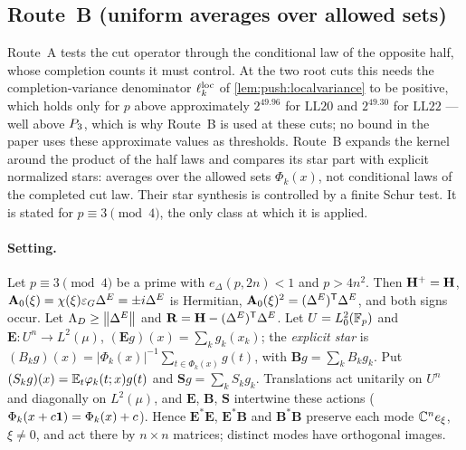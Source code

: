 \subsection{Route~B (uniform averages over allowed sets)}\label{subsec:spec:routeB}

Route~A tests the cut operator through the conditional law of the opposite half,
whose completion counts it must control. At the two root cuts this needs the
completion-variance denominator $\ell^{\rm loc}_k$ of \cref{lem:push:localvariance} to
be positive, which holds only for $p$ above approximately
$2^{49.96}$ for $\mathrm{LL20}$ and $2^{49.30}$ for
$\mathrm{LL22}$ --- well above $P_3$, which is why Route~B
is used at these cuts; no bound in the paper uses these
approximate values as thresholds. Route~B expands the kernel
around the product of the
half laws and compares its star part with explicit normalized stars: averages over
the allowed sets $\Phi_k(x)$, not conditional laws of the completed cut law. Their
star synthesis is controlled by a finite Schur test. It is stated for $p\equiv3\pmod4$, the
only class at which it is applied.

\paragraph{Setting.}
Let $p\equiv3\pmod4$ be a prime with $e_\Delta(p,2n)<1$ and $p>4n^2$. Then
$\mathbf H^+=\mathbf H$, $\mathbf A_{0}(\xi)=\chi(\xi)\varepsilon_G\Delta^E=\pm i\Delta^E$ is Hermitian,
$\mathbf A_{0}(\xi)^2=(\Delta^E)^{\mathsf T}\Delta^E$, and both signs occur. Let $\Lambda_D\ge\left\|\Delta^E\right\|$
and $\mathbf R=\mathbf H-(\Delta^E)^{\mathsf T}\Delta^E$. Let $U=L^2_0(\mathbb F_p)$ and
$\mathbf E\colon U^n\to L^2(\mu)$, $(\mathbf Eg)(x)=\sum_kg_k(x_k)$; the \emph{explicit star}
is $(B_kg)(x)=|\Phi_k(x)|^{-1}\sum_{t\in\Phi_k(x)}g(t)$, with $\mathbf Bg=\sum_kB_kg_k$. Put
$(S_kg)(x)=\mathbb E_t\varphi_k(t;x)g(t)$ and $\mathbf Sg=\sum_kS_kg_k$. Translations act unitarily
on $U^n$ and diagonally on $L^2(\mu)$, and $\mathbf E$, $\mathbf B$, $\mathbf S$ intertwine
these actions ($\Phi_k(x+c\mathbf 1)=\Phi_k(x)+c$). Hence $\mathbf E^*\mathbf E$, $\mathbf E^*\mathbf B$
and $\mathbf B^*\mathbf B$ preserve each mode $\mathbb C^ne_\xi$, $\xi\ne0$, and act there by
$n\times n$ matrices; distinct modes have orthogonal images.

